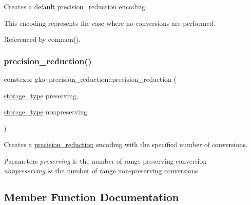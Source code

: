 Creates a default \hyperlink{classgko_1_1precision__reduction}{precision\+\_\+reduction} encoding. 

This encoding represents the case where no conversions are performed. 

Referenced by common().

\mbox{\label{classgko_1_1precision__reduction_ae4d4355a6614ced4fc611619da7b09f2}} 
\subsubsection{\texorpdfstring{precision\+\_\+reduction()}{precision\_reduction()}\hspace{0.1cm}{\footnotesize\ttfamily [2/2]}}
{\footnotesize\ttfamily constexpr gko\+::precision\+\_\+reduction\+::precision\+\_\+reduction (\begin{DoxyParamCaption}\item[{\hyperlink{classgko_1_1precision__reduction_a2a1a94a27fa69b4cc321136b56e7b7d9}{storage\+\_\+type}}]{preserving,  }\item[{\hyperlink{classgko_1_1precision__reduction_a2a1a94a27fa69b4cc321136b56e7b7d9}{storage\+\_\+type}}]{nonpreserving }\end{DoxyParamCaption})\hspace{0.3cm}{\ttfamily [noexcept]}}



Creates a \hyperlink{classgko_1_1precision__reduction}{precision\+\_\+reduction} encoding with the specified number of conversions. 


\begin{DoxyParams}{Parameters}
{\em preserving} & the number of range preserving conversion \\
\hline
{\em nonpreserving} & the number of range non-\/preserving conversions \\
\hline
\end{DoxyParams}


\subsection{Member Function Documentation}
\mbox{\label{classgko_1_1precision__reduction_ac4109c61fadb24db7a1888c51ac483e9}} 

